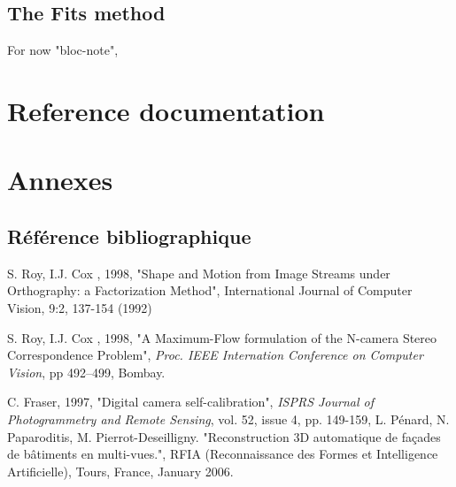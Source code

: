 \documentclass[a4paper]{book}
\begin{document}
{\label{HelpCmd}



\chapter{The Fits method}

For now "bloc-note",

}






\part{Reference documentation}




\part{Annexes}

\appendix

\chapter{R\'ef\'erence bibliographique}


\begin{thebibliography}{AAA}
      S. Roy, I.J. Cox , 1998, "Shape and Motion from Image 
            Streams under Orthography: a Factorization Method", International Journal of Computer Vision, 
            9:2, 137-154 (1992)


      S. Roy, I.J. Cox , 1998, "A Maximum-Flow
            formulation of the N-camera Stereo Correspondence
      Problem", \emph{Proc. IEEE Internation Conference on
      Computer Vision}, pp 492--499, Bombay.

     C. Fraser, 1997, "Digital camera self-calibration",
   \emph{ISPRS Journal of Photogrammetry and Remote Sensing}, vol. 52, issue 4, pp. 149-159,
      L. Pénard, N. Paparoditis, M. Pierrot-Deseilligny.
           "Reconstruction 3D automatique de façades de bâtiments en multi-vues.",
            RFIA (Reconnaissance des Formes et Intelligence Artificielle),
            Tours, France, January 2006.
\end{thebibliography}


\printindex
\end{document}
